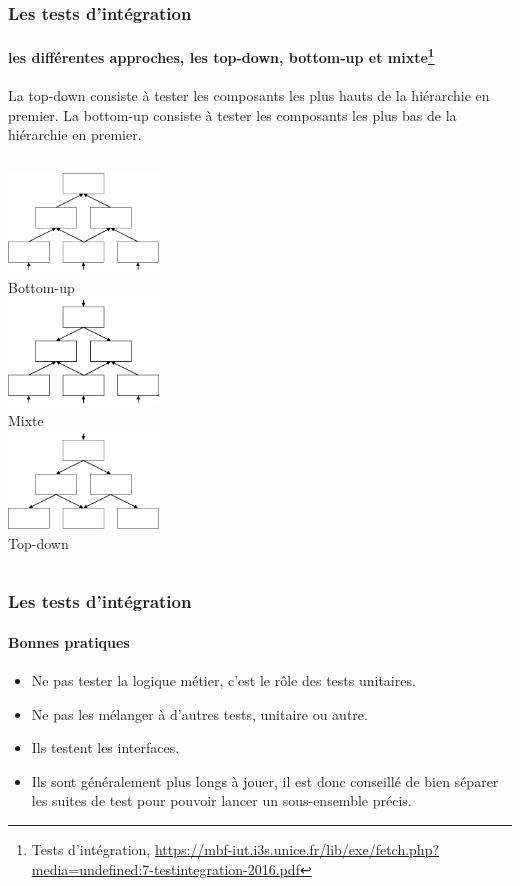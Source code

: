 \documentclass{beamer}
\begin{document}
    \begin{frame}
        \transdissolve
        \frametitle{Les tests d'intégration}
        \framesubtitle{les différentes approches, les top-down, bottom-up et mixte\footnote{\label{unice-ti} Tests d’intégration, \url{https://mbf-iut.i3s.unice.fr/lib/exe/fetch.php?media=undefined:7-testintegration-2016.pdf}}}
        La top-down consiste à tester les composants les plus hauts de la hiérarchie en premier.
        \break
        La bottom-up consiste à tester les composants les plus bas de la hiérarchie en premier.
        \begin{columns}
            \centering
            \includegraphics[width=4cm]{image/ti-bottom-up.drawio} \\ Bottom-up \\
            \centering
            \includegraphics[width=4cm]{image/ti-mixte.drawio} \\ Mixte \\
            \centering
            \includegraphics[width=4cm]{image/ti-top-down.drawio} \\ Top-down \\
        \end{columns}
    \end{frame}

    \begin{frame}
        \transdissolve
        \frametitle{Les tests d'intégration}
        \framesubtitle{Bonnes pratiques}
        \begin{itemize}
            \item Ne pas tester la logique métier, c'est le rôle des tests unitaires.
            \item Ne pas les mélanger à d'autres tests, unitaire ou autre.
            \item Ils testent les interfaces.
            \item Ils sont généralement plus longs à jouer, il est donc conseillé de bien séparer les suites de test pour pouvoir lancer un sous-ensemble précis.
        \end{itemize}
    \end{frame}
\end{document}
